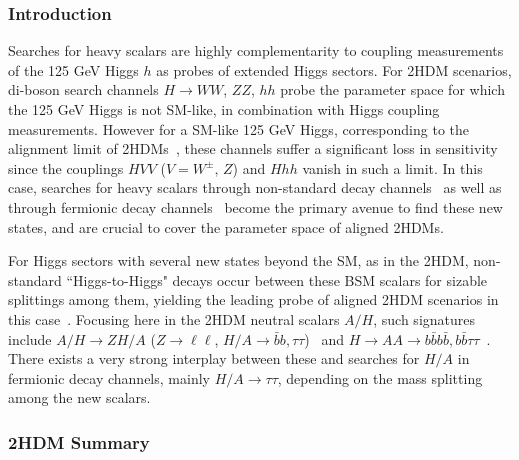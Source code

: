 \documentclass[../report.tex]{subfiles}
\begin{document}
\subsubsection{Introduction}

Searches for heavy scalars are highly complementarity to coupling measurements of the 125 GeV Higgs $h$ as probes of extended Higgs sectors. For 2HDM scenarios, di-boson search channels $H \to WW$, $ZZ$, $hh$ probe the parameter space for which the 125 GeV Higgs is not SM-like, in combination with Higgs coupling measurements.
However for a SM-like 125 GeV Higgs, corresponding to the alignment limit of 2HDMs~\cite{Gunion:2002zf}, these channels suffer a significant loss in  
sensitivity since the couplings $HVV$ ($V = W^{\pm},\,Z$) and $Hhh$ vanish in such a limit. In this case, searches for heavy scalars through non-standard decay channels~\cite{Coleppa:2014hxa,Dorsch:2014qja,Li:2015lra,Kling:2016opi} 
as well as through fermionic decay channels~\cite{Craig:2015jba,Gori:2016zto} become the primary avenue to find these new states, and are crucial to cover the parameter space of aligned 2HDMs.

For Higgs sectors with several new states beyond the SM, as in the 2HDM, 
non-standard ``Higgs-to-Higgs" decays occur between these BSM scalars for sizable splittings among them, yielding the leading probe of aligned 
2HDM scenarios in this case~\cite{Dorsch:2016tab}. 
Focusing here in the 2HDM neutral scalars $A/H$, such signatures include 
$A/H\to Z H/A$ ($Z \to \ell \ell$, $H/A \to \bar{b}b, \tau\tau$)~\cite{Coleppa:2014hxa,Dorsch:2014qja} and 
$H \to A A \to b\bar{b} b\bar{b}, b\bar{b} \tau\tau$~\cite{Brooijmans:2018xbu}.
There exists a very strong interplay between these and searches for $H/A$ in fermionic decay channels, mainly  
$H/A \to \tau\tau$, depending on the mass splitting among the new scalars.

\subsubsection{2HDM Summary}
\end{document}
